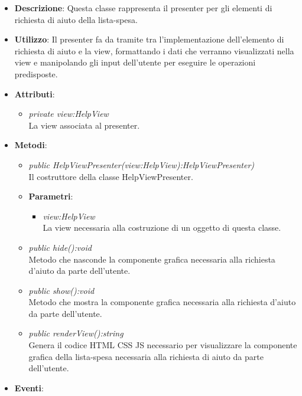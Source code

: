 \begin{itemize}
\item \textbf{Descrizione}: Questa classe rappresenta il presenter per gli elementi di richiesta di aiuto della lista-spesa.
\item \textbf{Utilizzo}: Il presenter fa da tramite tra l'implementazione dell'elemento di richiesta di aiuto e la view, formattando i dati che verranno visualizzati nella view e manipolando gli input dell'utente per eseguire le operazioni predisposte.
\item \textbf{Attributi}:
	\begin{itemize}
	\item \textit{private view:HelpView}\\
	La view associata al presenter.
	\end{itemize}
\item \textbf{Metodi}:
	\begin{itemize}
	\item \textit{public HelpViewPresenter(view:HelpView):HelpViewPresenter)}\\
	Il costruttore della classe HelpViewPresenter.
			\item{\textbf{Parametri}: \begin{itemize}
			\item \textit{view:HelpView}\\
			La view necessaria alla costruzione di un oggetto di questa classe.
			\end{itemize}}
	\item \textit{public hide():void}\\
	Metodo che nasconde la componente grafica necessaria alla richiesta d'aiuto da parte dell'utente.
	\item \textit{public show():void}\\
	Metodo che mostra la componente grafica necessaria alla richiesta d'aiuto da parte dell'utente.
	\item \textit{public renderView():string}\\
	Genera il codice HTML CSS JS necessario per visualizzare la componente grafica della lista-spesa necessaria alla richiesta di aiuto da parte dell'utente.
	\end{itemize}
\item \textbf{Eventi}:
\end{itemize}